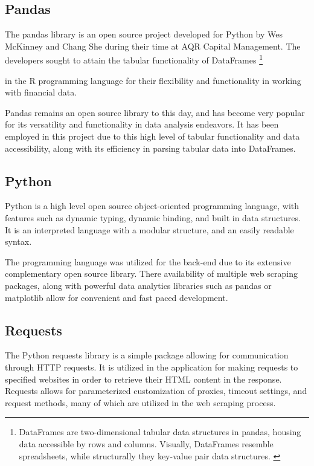 \documentclass{thesis-ekf}
\theoremstyle{definition}
\theoremstyle{remark}
\begin{document}
{\subsection{Pandas}
The pandas library is an open source project developed for Python by Wes McKinney and Chang She during their time at  AQR Capital Management. The developers sought to attain the tabular functionality of DataFrames \footnote{DataFrames are two-dimensional tabular data structures in pandas, housing data accessible by rows and columns. Visually, DataFrames resemble spreadsheets, while structurally they key-value pair data structures. \cite{wiki-pd}}} in the R programming language for their flexibility and functionality in working with financial data. \cite{wiki-pd}

Pandas remains an open source library to this day, and has become very popular for its versatility and functionality in data analysis endeavors. It has been employed in this project due to this high level of tabular functionality and data accessibility, along with its efficiency in parsing tabular data into DataFrames.

\subsection{Python} \label{sub-python}
Python is a high level open source object-oriented programming language, with features such as dynamic typing, dynamic binding, and built in data structures. It is an interpreted language with a modular structure, and an easily readable syntax. \cite{python}

The programming language was utilized for the back-end due to its extensive complementary open source library. There availability of multiple web scraping packages, along with powerful data analytics libraries such as pandas or matplotlib allow for convenient and fast paced development.

\subsection{Requests}
The Python requests library is a simple package allowing for communication through HTTP requests. \cite{req} It is utilized in the application for making requests to specified websites in order to retrieve their HTML content in the response. Requests allows for parameterized customization of proxies, timeout settings, and request methods, many of which are utilized in the web scraping process. 
\end{document}
